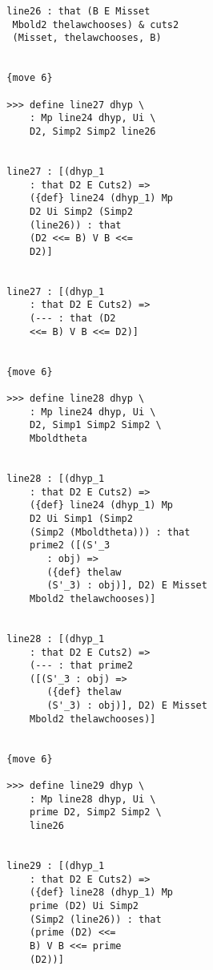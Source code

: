 \documentclass[12pt]{article}
\begin{document}
\begin{verbatim}
                     line26 : that (B E Misset 
                      Mbold2 thelawchooses) & cuts2 
                      (Misset, thelawchooses, B)


                     {move 6}

                     >>> define line27 dhyp \
                         : Mp line24 dhyp, Ui \
                         D2, Simp2 Simp2 line26


                     line27 : [(dhyp_1 
                         : that D2 E Cuts2) => 
                         ({def} line24 (dhyp_1) Mp 
                         D2 Ui Simp2 (Simp2 
                         (line26)) : that 
                         (D2 <<= B) V B <<= 
                         D2)]


                     line27 : [(dhyp_1 
                         : that D2 E Cuts2) => 
                         (--- : that (D2 
                         <<= B) V B <<= D2)]


                     {move 6}

                     >>> define line28 dhyp \
                         : Mp line24 dhyp, Ui \
                         D2, Simp1 Simp2 Simp2 \
                         Mboldtheta


                     line28 : [(dhyp_1 
                         : that D2 E Cuts2) => 
                         ({def} line24 (dhyp_1) Mp 
                         D2 Ui Simp1 (Simp2 
                         (Simp2 (Mboldtheta))) : that 
                         prime2 ([(S'_3 
                            : obj) => 
                            ({def} thelaw 
                            (S'_3) : obj)], D2) E Misset 
                         Mbold2 thelawchooses)]


                     line28 : [(dhyp_1 
                         : that D2 E Cuts2) => 
                         (--- : that prime2 
                         ([(S'_3 : obj) => 
                            ({def} thelaw 
                            (S'_3) : obj)], D2) E Misset 
                         Mbold2 thelawchooses)]


                     {move 6}

                     >>> define line29 dhyp \
                         : Mp line28 dhyp, Ui \
                         prime D2, Simp2 Simp2 \
                         line26


                     line29 : [(dhyp_1 
                         : that D2 E Cuts2) => 
                         ({def} line28 (dhyp_1) Mp 
                         prime (D2) Ui Simp2 
                         (Simp2 (line26)) : that 
                         (prime (D2) <<= 
                         B) V B <<= prime 
                         (D2))]



\end{verbatim}
\end{document}
